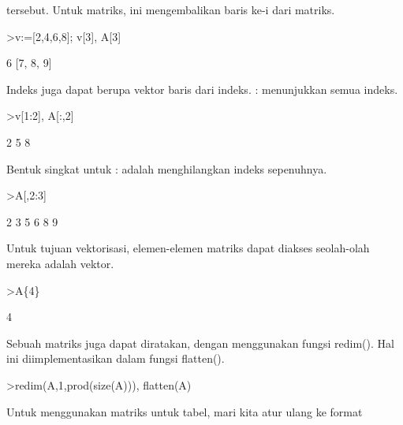 \documentclass[a4paper,10pt]{article}
\begin{document}
\begin{eulernotebook}
\begin{eulercomment}
tersebut. Untuk matriks, ini mengembalikan baris ke-i dari matriks.
\end{eulercomment}
\begin{eulerprompt}
>v:=[2,4,6,8]; v[3], A[3]
\end{eulerprompt}
\begin{euleroutput}
  6
  [7,  8,  9]
\end{euleroutput}
\begin{eulercomment}
Indeks juga dapat berupa vektor baris dari indeks. : menunjukkan semua
indeks.
\end{eulercomment}
\begin{eulerprompt}
>v[1:2], A[:,2]
\end{eulerprompt}
\begin{euleroutput}
  [2,  4]
              2 
              5 
              8 
\end{euleroutput}
\begin{eulercomment}
Bentuk singkat untuk : adalah menghilangkan indeks sepenuhnya.
\end{eulercomment}
\begin{eulerprompt}
>A[,2:3]
\end{eulerprompt}
\begin{euleroutput}
              2             3 
              5             6 
              8             9 
\end{euleroutput}
\begin{eulercomment}
Untuk tujuan vektorisasi, elemen-elemen matriks dapat diakses
seolah-olah mereka adalah vektor.
\end{eulercomment}
\begin{eulerprompt}
>A\{4\}
\end{eulerprompt}
\begin{euleroutput}
  4
\end{euleroutput}
\begin{eulercomment}
Sebuah matriks juga dapat diratakan, dengan menggunakan fungsi
redim(). Hal ini diimplementasikan dalam fungsi flatten().
\end{eulercomment}
\begin{eulerprompt}
>redim(A,1,prod(size(A))), flatten(A)
\end{eulerprompt}
\begin{euleroutput}
  [1,  2,  3,  4,  5,  6,  7,  8,  9]
  [1,  2,  3,  4,  5,  6,  7,  8,  9]
\end{euleroutput}
\begin{eulercomment}
Untuk menggunakan matriks untuk tabel, mari kita atur ulang ke format

\end{eulercomment}
\end{eulernotebook}
\end{document}
